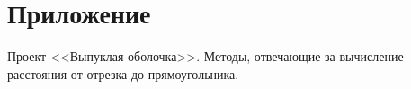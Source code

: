 \section{Приложение}

Проект <<Выпуклая оболочка>>. Методы, отвечающие за вычисление расстояния от отрезка до прямоугольника.


